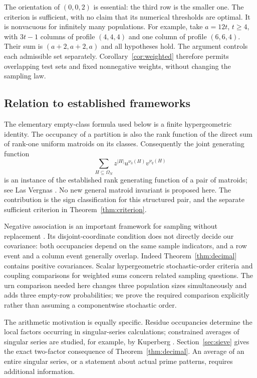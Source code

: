 \documentclass[11pt,a4paper]{article}
\theoremstyle{remark}
\numberwithin{equation}{section}
\begin{document}
The orientation of \((0,0,2)\) is essential: the third row is the smaller
one. The criterion is sufficient, with no claim that its numerical
thresholds are optimal. It is nonvacuous for infinitely many populations.
For example, take \(a=12t\), \(t\ge4\), with \(3t-1\) columns of profile
\((4,4,4)\) and one column of profile \((6,6,4)\).
Their sum is \((a+2,a+2,a)\) and all hypotheses hold.
The argument controls each admissible set separately.
Corollary~\ref{cor:weighted} therefore permits overlapping test sets
and fixed nonnegative weights, without changing the sampling law.

\subsection{Relation to established frameworks}\label{sec:context}
The elementary empty-class formula used below is a finite
hypergeometric identity. The occupancy of a partition is also the rank
function of the direct sum of rank-one uniform matroids on its classes.
Consequently the joint generating function
\[
 \sum_{H\subseteq\Omega_N} z^{|H|}u^{\nu_3(H)}v^{\nu_q(H)}
\]
is an instance of the established rank generating function of a pair of
matroids; see Las Vergnas \cite[p.~305]{lasvergnas}. No new general
matroid invariant is proposed here. The contribution is the sign
classification for this structured pair, and the separate sufficient
criterion in Theorem~\ref{thm:criterion}.

Negative association is an important framework for sampling without
replacement \cite{joagdev}. Its disjoint-coordinate condition does not
directly decide our covariance: both occupancies depend on the same
sample indicators, and a row event and a column event generally overlap.
Indeed Theorem~\ref{thm:decimal} contains positive covariances.
Scalar hypergeometric stochastic-order criteria \cite{klm} and
coupling comparisons for weighted sums \cite{benhamou} concern related
sampling questions. The urn comparison needed here changes three
population sizes simultaneously and adds three empty-row probabilities;
we prove the required comparison explicitly rather than assuming a
componentwise stochastic order.

The arithmetic motivation is equally specific. Residue occupancies
determine the local factors occurring in singular-series calculations;
constrained averages of singular series are studied, for example, by
Kuperberg \cite{kuperberg}. Section~\ref{sec:sieve} gives the exact
two-factor consequence of Theorem~\ref{thm:decimal}. An average of an
entire singular series, or a statement about actual prime patterns,
requires additional information.
\end{document}
